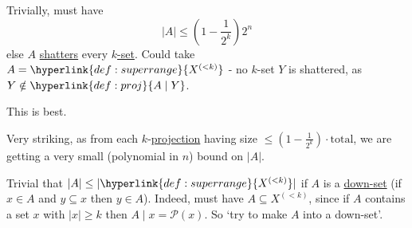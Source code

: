 \documentclass{article}
\let\subset\subseteq
\begin{document}
Trivially, must have
\begin{equation*}
  |A| \leq \left(1 - \frac{1}{2^k}\right) 2^n
\end{equation*}
else $A$ \hyperlink{def:tr}{shatters} every \hyperlink{def:superr}{$k$-set}.
Could take $A = \hyperlink{def:superrange}{X^{(<k)}}$ - no $k$-set $Y$ is shattered, as $Y \notin \hyperlink{def:proj}{A \mid Y}$.

\begin{aim}
  This is best.
\end{aim}
\begin{remark}
  Very striking, as from each $k$-\hyperlink{def:proj}{projection} having size $\leq (1 - \frac{1}{2^k}) \cdot \text{total}$, we are getting a very small (polynomial in $n$) bound on $|A|$.
\end{remark}

\begin{idea}
  Trivial that $|A| \leq |\hyperlink{def:superrange}{X^{(<k)}}|$ if $A$ is a \hyperlink{def:downset}{down-set} (if $x \in A$ and $y \subset x$ then $y \in A$).
  Indeed, must have $A \subset X^{(<k)}$, since if $A$ contains a set $x$ with $|x| \geq k$ then $A \mid x = \mathcal{P}(x)$.
  So `try to make $A$ into a down-set'.
\end{idea}
\end{document}
